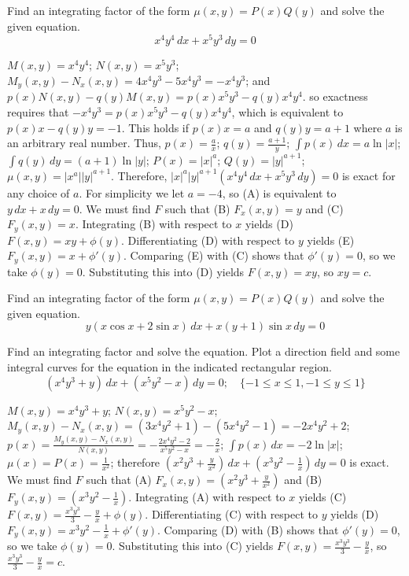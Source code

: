 \documentclass{ximera}
\begin{document}
\begin{problem}\label{exer:2.6.22}Find an integrating factor of the form $\mu(x,y)=P(x)Q(y)$ and solve the given equation.
$$x^4y^4\,dx+x^5y^3\,dy=0$$



\begin{solution}
    $M(x,y)=x^4y^4$;\;
$N(x,y)=x^5y^3$;\;
 $M_y(x,y)-N_x(x,y)=4x^4y^3-5x^4y^3=-x^4y^3$;
and  $p(x)N(x,y)-q(y)M(x,y)=p(x)x^5y^3-q(y)x^4y^4$.
so exactness requires that
 $-x^4y^3=p(x)x^5y^3-q(y)x^4y^4$, which is equivalent to
 $p(x)x-q(y)y=-1$. This holds if
 $p(x)x=a$ and $q(y)y=a+1$  where $a$ is an arbitrary real number.
Thus,
 $p(x)=\frac{a}{x}$;\;
 $q(y)=\frac{a+1}{y}$;\;
$\int p(x)\,dx=a\ln|x|$;\;
$\int q(y)\,dy=(a+1)\ln|y|$;\;
$P(x)=|x|^a$;
$Q(y)=|y|^{a+1}$;
$\mu(x,y)=|x^a||y|^{a+1}$.
Therefore,
$|x|^a|y|^{a+1}\left(x^4y^4\,dx+x^5y^3\,dy\right)=0$
is exact for any choice of $a$. For simplicity we let $a=-4$,
so (A)  is equivalent to $y\,dx+x\,dy=0$.
We must find $F$ such that
(B) $F_x(x,y)=y$ and
(C) $F_y(x,y)=x$.
Integrating (B) with respect to $x$ yields
(D) $F(x,y)=xy+\phi(y)$.
Differentiating (D) with respect to $y$  yields
(E) $F_y(x,y)=x+\phi'(y)$.
Comparing (E) with (C)  shows that
$\phi'(y)=0$, so we take
$\phi(y)=0$.
Substituting this into (D) yields
$F(x,y)=xy$,
so $xy=c$.

\end{solution}
\end{problem}

\begin{problem}\label{exer:2.6.23} Find an integrating factor of the form $\mu(x,y)=P(x)Q(y)$ and solve the given equation.
$$y(x\cos x+2\sin x)\,dx+x(y+1)\sin x\,dy=0$$
\end{problem}

\begin{problem}\label{exer:2.6.24} Find an integrating factor and solve the  equation. Plot a direction field and some integral curves for the equation in the indicated rectangular region.
 $$(x^4y^3+y)\,dx+(x^5y^2-x)\,dy=0;   \quad \{-1\leq x\leq 1,-1\leq  y\leq 1\}$$

 

 \begin{solution}
     $M(x,y)=x^4y^3+y$;\;
$N(x,y)=x^5y^2-x$;\;
$M_y(x,y)-N_x(x,y)=(3x^4y^2+1)-(5x^4y^2-1)=-2x^4y^2+2$;\;
$p(x)=\frac{M_y(x,y)-N_x(x,y)}{ N(x,y)}=-\frac{2x^4y^2-2
}{ x^5y^2-x}=-\frac{2}{ x}$;\;
$\int p(x)\,dx=-2\ln|x|$;\;
$\mu(x)=P(x)=\frac{1}{ x^2}$;
therefore
$\left(x^2y^3+\frac{y}{ x^2}\right)\,dx+
\left(x^3y^2-\frac{1}{ x}\right)\,dy=0$
is exact.
We must find $F$ such that
(A) $F_x(x,y)=\left(x^2y^3+\frac{y}{ x^2}\right)$ and
(B) $F_y(x,y)=\left(x^3y^2-\frac{1}{ x}\right)$.
Integrating (A) with respect to $x$ yields
(C) $F(x,y)=\frac{x^3y^3}{3}-\frac{y}{ x}+\phi(y)$.
Differentiating (C) with respect to $y$  yields
(D) $F_y(x,y)=x^3y^2-\frac{1}{ x}+\phi'(y)$.
Comparing (D) with (B)  shows that
$\phi'(y)=0$, so we take
$\phi(y)=0$.
Substituting this into (C) yields
$F(x,y)=\frac{x^3y^3}{3}-\frac{y}{ x}$,
so $\frac{x^3y^3}{3}-\frac{y}{ x}=c$.

 \end{solution}
\end{problem}
\end{document}
